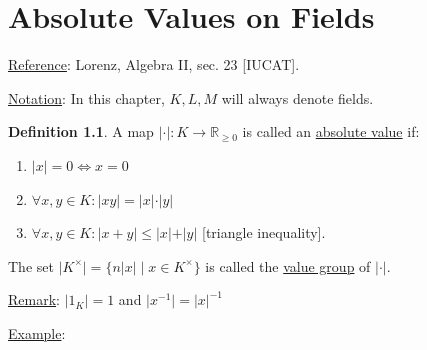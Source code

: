 \documentclass[openany]{amsbook}
\numberwithin{section}{chapter}
\theoremstyle{definition}
\newtheorem*{definition}{Definition}
\begin{document}
\chapter{Absolute Values on Fields}

\underline{Reference}: Lorenz, Algebra II, sec. 23 [IUCAT].

\underline{Notation}: In this chapter, \(K,L,M\) will always denote fields.

\begin{definition}
    A map \(\vert \cdot \vert : K \to \mathbb{R} _{\geq 0}\) is called an \underline{absolute value} if:
    
    \begin{enumerate}[label=\arabic*)]
        \item \(\vert x \vert = 0 \iff x = 0\) 
        \item \(\forall x,y\in K : \vert xy \vert = \vert x \vert \cdot \vert y \vert \) 
        \item \(\forall x,y\in K: \vert x+y \vert \leq \vert x \vert + \vert y \vert \) [triangle inequality]. 
    \end{enumerate} 

    The set \(\vert K^\times \vert = \{ n\vert x \vert \mid x\in K^\times \} \) is called the \underline{value group} of \(\vert \cdot \vert \). 
\end{definition}

\underline{Remark}: \(\vert 1_K \vert = 1\) and \(\vert x ^{-1} \vert = \vert x \vert ^{-1}\) 

\underline{Example}:
\end{document}
